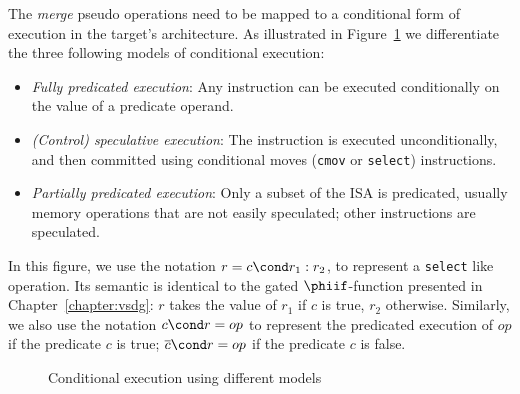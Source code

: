 The \textit{merge} pseudo operations need to be mapped to a conditional form of execution in the target's architecture. As illustrated in Figure~\ref{fig:pred} we differentiate the three following models of conditional execution:
\begin{itemize}
\item \emph{Fully predicated execution}: Any instruction can be executed conditionally on the value of a predicate operand.
\item \emph{(Control) speculative execution}: The instruction is executed unconditionally, and then committed using conditional moves (\texttt{cmov} or \texttt{select}) instructions.
\item \emph{Partially predicated execution}: Only a subset of the ISA is predicated, usually memory operations that are not easily speculated; other instructions are speculated.
\end{itemize}
In this figure, we use the notation $r = c \cond r_1:r_2$, to represent a \texttt{select} like operation. 
Its semantic is identical to the gated $\phiif$-function presented in Chapter~\ref{chapter:vsdg}: 
$r$ takes the value of $r_1$ if $c$ is true, $r_2$ otherwise. 
Similarly, we also use the notation $c \cond r = op$ to represent the predicated execution of $op$ if the predicate $c$ is true; 
$\overline{c} \cond r = op$ if the predicate $c$ is false.

\begin{figure}[h]
\footnotesize
{}
\hfill
{} \hfill
{}
\caption{Conditional execution using different models}
\label{fig:pred}
\end{figure}

